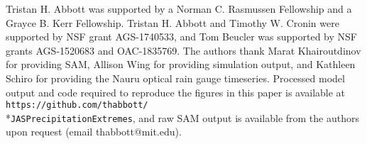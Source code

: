 \documentclass[twocol]{ametsoc}
\begin{document}
%

\acknowledgments
Tristan H. Abbott was supported by a Norman C. Rasmussen Fellowship and a Grayce B. Kerr Fellowship. Tristan H. Abbott and Timothy W. Cronin were supported by NSF grant AGS-1740533, and Tom Beucler was supported by NSF grants AGS-1520683 and OAC-1835769. The authors thank Marat Khairoutdinov for providing SAM, Allison Wing for providing simulation output, and Kathleen Schiro for providing the Nauru optical rain gauge timeseries. Processed model output and code required to reproduce the figures in this paper is available at {\tt https://github.com/thabbott/}\\*{\tt JASPrecipitationExtremes}, and raw SAM output is available from the authors upon request (email thabbott@mit.edu).

%






%
%
%
\end{document}
